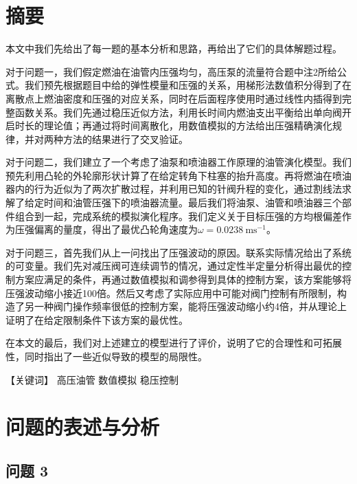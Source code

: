 \documentclass{article}
\newcommand{\vel}{~\mathrm{ms^{-1}}}
\begin{document}
\section{摘要}
	本文中我们先给出了每一题的基本分析和思路，再给出了它们的具体解题过程。

	对于问题一，我们假定燃油在油管内压强均匀，高压泵的流量符合题中注2所给公式。我们预先根据题目中给的弹性模量和压强的关系，用梯形法数值积分得到了在离散点上燃油密度和压强的对应关系，同时在后面程序使用时通过线性内插得到完整函数关系。我们先通过稳压近似方法，利用长时间内燃油支出平衡给出单向阀开启时长的理论值；再通过将时间离散化，用数值模拟的方法给出压强精确演化规律，并对两种方法的结果进行了交叉验证。
	
	对于问题二，我们建立了一个考虑了油泵和喷油器工作原理的油管演化模型。我们预先利用凸轮的外轮廓形状计算了在给定转角下柱塞的抬升高度。再将燃油在喷油器内的行为近似为了两次扩散过程，并利用已知的针阀升程的变化，通过割线法求解了给定时间和油管压强下的喷油器流量。最后我们将油泵、油管和喷油器三个部件组合到一起，完成系统的模拟演化程序。我们定义关于目标压强的方均根偏差作为压强偏离的量度，得出了最优凸轮角速度为$\omega=0.0238\vel$。
	
	对于问题三，首先我们从上一问找出了压强波动的原因。联系实际情况给出了系统的可变量。我们先对减压阀可连续调节的情况，通过定性半定量分析得出最优的控制方案应满足的条件，再通过数值模拟和调参得到具体的控制方案，该方案能够将压强波动缩小接近100倍。然后又考虑了实际应用中可能对阀门控制有所限制，构造了另一种阀门操作频率很低的控制方案，能将压强波动缩小约4倍，并从理论上证明了在给定限制条件下该方案的最优性。
	
	在本文的最后，我们对上述建立的模型进行了评价，说明了它的合理性和可拓展性，同时指出了一些近似导致的模型的局限性。

	【关键词】	高压油管 数值模拟 稳压控制
\section{问题的表述与分析}
	\subsection{问题 3}
\end{document}
